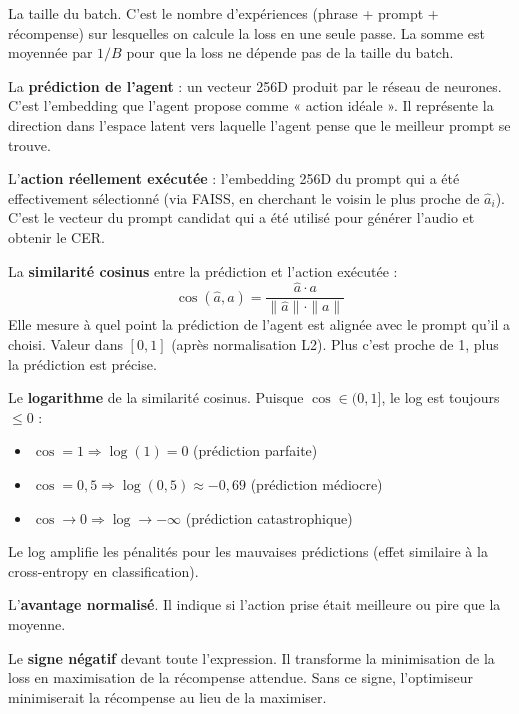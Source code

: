 \documentclass[11pt,a4paper]{article}
\begin{document}
\begin{description}[style=nextline, leftmargin=2cm]
    \item[$B$] La taille du batch. C'est le nombre d'expériences (phrase + prompt + récompense) sur lesquelles on calcule la loss en une seule passe. La somme est moyennée par $1/B$ pour que la loss ne dépende pas de la taille du batch.
    
    \item[$\hat{a}_i$] La \textbf{prédiction de l'agent} : un vecteur 256D produit par le réseau de neurones. C'est l'embedding que l'agent propose comme « action idéale ». Il représente la direction dans l'espace latent vers laquelle l'agent pense que le meilleur prompt se trouve.
    
    \item[$a_i$] L'\textbf{action réellement exécutée} : l'embedding 256D du prompt qui a été effectivement sélectionné (via FAISS, en cherchant le voisin le plus proche de $\hat{a}_i$). C'est le vecteur du prompt candidat qui a été utilisé pour générer l'audio et obtenir le CER.
    
    \item[$\cos(\hat{a}_i, a_i)$] La \textbf{similarité cosinus} entre la prédiction et l'action exécutée :
    \begin{equation}
    \cos(\hat{a}, a) = \frac{\hat{a} \cdot a}{\|\hat{a}\| \cdot \|a\|}
    \end{equation}
    Elle mesure à quel point la prédiction de l'agent est alignée avec le prompt qu'il a choisi. Valeur dans $[0, 1]$ (après normalisation L2). Plus c'est proche de 1, plus la prédiction est précise.
    
    \item[$\log\!\big(\cos(\hat{a}_i, a_i)\big)$] Le \textbf{logarithme} de la similarité cosinus. Puisque $\cos \in (0, 1]$, le log est toujours $\leq 0$ :
    \begin{itemize}
        \item $\cos = 1 \Rightarrow \log(1) = 0$ (prédiction parfaite)
        \item $\cos = 0{,}5 \Rightarrow \log(0{,}5) \approx -0{,}69$ (prédiction médiocre)
        \item $\cos \to 0 \Rightarrow \log \to -\infty$ (prédiction catastrophique)
    \end{itemize}
    Le log amplifie les pénalités pour les mauvaises prédictions (effet similaire à la cross-entropy en classification).
    
    \item[$\hat{A}_i$] L'\textbf{avantage normalisé}. Il indique si l'action prise était meilleure ou pire que la moyenne.
    
    \item[$-$] Le \textbf{signe négatif} devant toute l'expression. Il transforme la minimisation de la loss en maximisation de la récompense attendue. Sans ce signe, l'optimiseur minimiserait la récompense au lieu de la maximiser.
\end{description}
\end{document}
